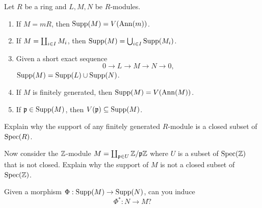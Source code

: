\documentclass{ximera}
\begin{document}
\begin{proposition}%
  Let $R$ be a ring and $L,M,N$ be $R$-modules.
  \begin{enumerate}
  \item If $M = mR$, then $\operatorname{Supp}(M) = V(\operatorname{Ann}(m))$.
  \item If $M = \coprod_{i\in I} M_i$, then $\operatorname{Supp}(M) = \bigcup_{i\in I} \operatorname{Supp}(M_i)$.
  \item Given a short exact sequence
    \[
    0 \to L \to M \to N \to 0,
    \]
    $\operatorname{Supp}(M) = \operatorname{Supp}(L) \cup \operatorname{Supp}(N)$.
  \item If $M$ is finitely generated, then $\operatorname{Supp}(M) = V(\operatorname{Ann}(M))$.
  \item If $\mathfrak{p}\in\operatorname{Supp}(M)$, then $V(\mathfrak{p})\subseteq\operatorname{Supp}(M)$.
  \end{enumerate}
\end{proposition}

\begin{exercise}
  Explain why the support of any finitely generated $R$-module is a
  closed subset of $\operatorname{Spec}(R)$.

  Now consider the $\mathbb Z$-module $M = \coprod_{\mathfrak{p}\in U} \mathbb Z/\mathfrak{p}\mathbb Z$ where $U$
  is a subset of $\operatorname{Spec}(\mathbb Z)$ that is not closed. Explain why the
  support of $M$ is not a closed subset of $\operatorname{Spec}(\mathbb Z)$.
\end{exercise}



\begin{exercise}
  Given a morphism $\Phi:\operatorname{Supp}(M) \to \operatorname{Supp}(N)$, can you induce
  \[
  \Phi^* : N\to M?
  \]
\end{exercise}
\end{document}
